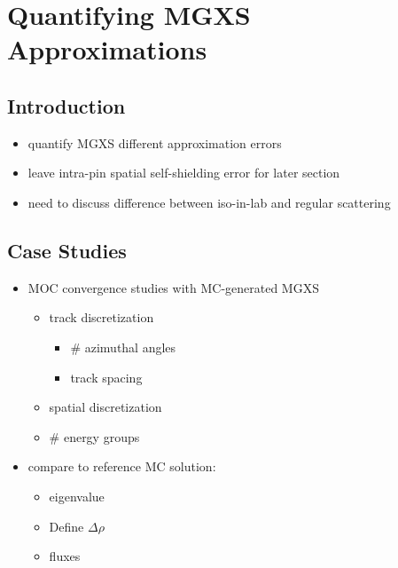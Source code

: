 \chapter{Quantifying MGXS Approximations}
\label{chap:mgxs-approx-error}

\section{Introduction}
\label{sec:chap4-intro}

\begin{itemize}[noitemsep]
  \item quantify \ac{MGXS} different approximation errors
  \item leave intra-pin spatial self-shielding error for later section
  \item need to discuss difference between iso-in-lab and regular scattering
\end{itemize}


\section{Case Studies}
\label{sec:chap4-case-studies}

\begin{itemize}[noitemsep]
  \item \ac{MOC} convergence studies with \ac{MC}-generated \ac{MGXS}
  \begin{itemize}[noitemsep]
    \item track discretization
    \begin{itemize}[noitemsep]
      \item \# azimuthal angles
      \item track spacing
    \end{itemize}
    \item spatial discretization
    \item \# energy groups  
  \end{itemize}
  \item compare to reference \ac{MC} solution:
  \begin{itemize}
    \item eigenvalue
	\item Define $\Delta\rho$
    \item fluxes
  \end{itemize}
\end{itemize}

